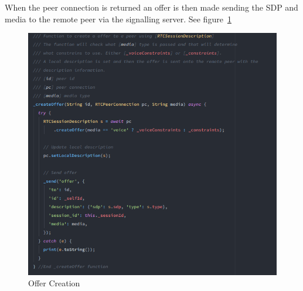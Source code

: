 When the peer connection is returned an offer is then made sending the SDP and media to the remote peer via the signalling server. See figure~\ref{image:createOfferFunc}
\begin{figure}[h!]
    \caption{Offer Creation}
    \label{image:createOfferFunc}
    \centering
    \includegraphics[width=1.0\textwidth]{images/create_offer_funtion.png}
\end{figure}

